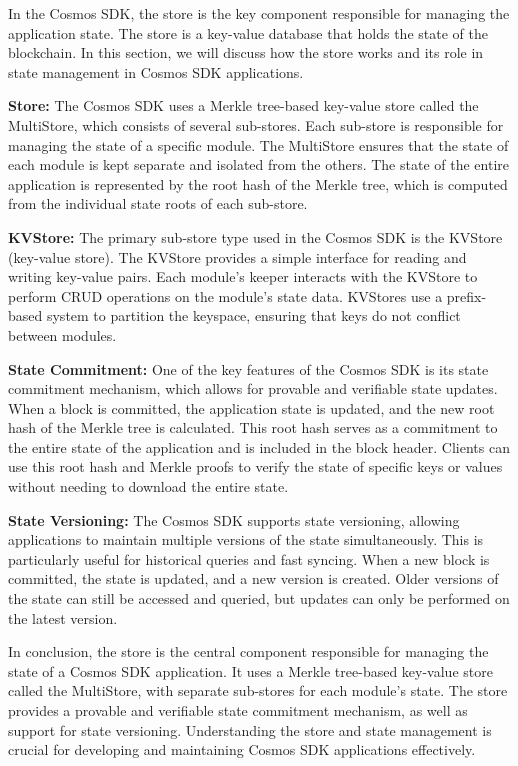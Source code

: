 \documentclass{article}
\begin{document}
In the Cosmos SDK, the store is the key component responsible for managing the application state. The store is a key-value database that holds the state of the blockchain. In this section, we will discuss how the store works and its role in state management in Cosmos SDK applications.

\textbf{Store:} The Cosmos SDK uses a Merkle tree-based key-value store called the MultiStore, which consists of several sub-stores. Each sub-store is responsible for managing the state of a specific module. The MultiStore ensures that the state of each module is kept separate and isolated from the others. The state of the entire application is represented by the root hash of the Merkle tree, which is computed from the individual state roots of each sub-store.

\textbf{KVStore:} The primary sub-store type used in the Cosmos SDK is the KVStore (key-value store). The KVStore provides a simple interface for reading and writing key-value pairs. Each module's keeper interacts with the KVStore to perform CRUD operations on the module's state data. KVStores use a prefix-based system to partition the keyspace, ensuring that keys do not conflict between modules.

\textbf{State Commitment:} One of the key features of the Cosmos SDK is its state commitment mechanism, which allows for provable and verifiable state updates. When a block is committed, the application state is updated, and the new root hash of the Merkle tree is calculated. This root hash serves as a commitment to the entire state of the application and is included in the block header. Clients can use this root hash and Merkle proofs to verify the state of specific keys or values without needing to download the entire state.

\textbf{State Versioning:} The Cosmos SDK supports state versioning, allowing applications to maintain multiple versions of the state simultaneously. This is particularly useful for historical queries and fast syncing. When a new block is committed, the state is updated, and a new version is created. Older versions of the state can still be accessed and queried, but updates can only be performed on the latest version.

In conclusion, the store is the central component responsible for managing the state of a Cosmos SDK application. It uses a Merkle tree-based key-value store called the MultiStore, with separate sub-stores for each module's state. The store provides a provable and verifiable state commitment mechanism, as well as support for state versioning. Understanding the store and state management is crucial for developing and maintaining Cosmos SDK applications effectively.
\end{document}
